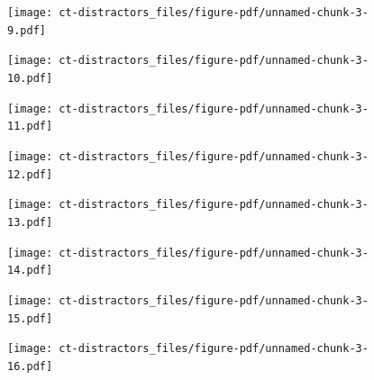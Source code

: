 \documentclass[
  letterpaper,
  DIV=11,
  numbers=noendperiod]{scrreprt}
\begin{document}
\begin{figure}[H]

{\centering \texttt{[image: ct-distractors\_files/figure-pdf/unnamed-chunk-3-9.pdf]}

}

\end{figure}

\begin{figure}[H]

{\centering \texttt{[image: ct-distractors\_files/figure-pdf/unnamed-chunk-3-10.pdf]}

}

\end{figure}

\begin{figure}[H]

{\centering \texttt{[image: ct-distractors\_files/figure-pdf/unnamed-chunk-3-11.pdf]}

}

\end{figure}

\begin{figure}[H]

{\centering \texttt{[image: ct-distractors\_files/figure-pdf/unnamed-chunk-3-12.pdf]}

}

\end{figure}

\begin{figure}[H]

{\centering \texttt{[image: ct-distractors\_files/figure-pdf/unnamed-chunk-3-13.pdf]}

}

\end{figure}

\begin{figure}[H]

{\centering \texttt{[image: ct-distractors\_files/figure-pdf/unnamed-chunk-3-14.pdf]}

}

\end{figure}

\begin{figure}[H]

{\centering \texttt{[image: ct-distractors\_files/figure-pdf/unnamed-chunk-3-15.pdf]}

}

\end{figure}

\begin{figure}[H]

{\centering \texttt{[image: ct-distractors\_files/figure-pdf/unnamed-chunk-3-16.pdf]}

}

\end{figure}
\end{document}
